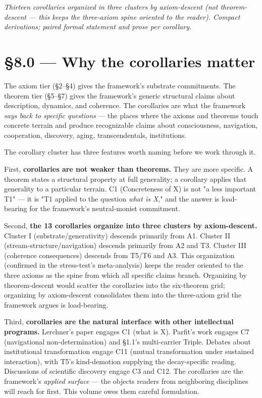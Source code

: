 \documentclass[11pt, openany]{book}
\newcommand{\sectionbreak}{\clearpage}
\begin{document}
\textit{Thirteen corollaries organized in three clusters by axiom-descent (not theorem-descent --- this keeps the three-axiom spine oriented to the reader). Compact derivations; paired formal statement and prose per corollary.}

\sectionbreak

\section{§8.0 --- Why the corollaries matter}

The axiom tier (§2–§4) gives the framework's substrate commitments. The theorem tier (§5–§7) gives the framework's generic structural claims about description, dynamics, and coherence. The corollaries are what the framework \textit{says back to specific questions} --- the places where the axioms and theorems touch concrete terrain and produce recognizable claims about consciousness, navigation, cooperation, discovery, aging, transcendentals, institutions.

The corollary cluster has three features worth naming before we work through it.

First, \textbf{corollaries are not weaker than theorems.} They are more specific. A theorem states a structural property at full generality; a corollary applies that generality to a particular terrain. C1 (Concreteness of X) is not "a less important T1" --- it is "T1 applied to the question \textit{what is X}," and the answer is load-bearing for the framework's neutral-monist commitment.

Second, \textbf{the 13 corollaries organize into three clusters by axiom-descent.} Cluster I (substrate/generativity) descends primarily from A1. Cluster II (stream-structure/navigation) descends primarily from A2 and T3. Cluster III (coherence consequences) descends from T5/T6 and A3. This organization (confirmed in the stress-test's meta-analysis) keeps the reader oriented to the three axioms as the spine from which all specific claims branch. Organizing by theorem-descent would scatter the corollaries into the six-theorem grid; organizing by axiom-descent consolidates them into the three-axiom grid the framework argues is load-bearing.

Third, \textbf{corollaries are the natural interface with other intellectual programs.} Lerchner's paper engages C1 (what is X). Parfit's work engages C7 (navigational non-determination) and §1.1's multi-carrier Triple. Debates about institutional transformation engage C11 (mutual transformation under sustained interaction), with T5's kind-demotion supplying the decay-specific reading. Discussions of scientific discovery engage C3 and C12. The corollaries are the framework's \textit{applied surface} --- the objects readers from neighboring disciplines will reach for first. This volume owes them careful formulation.
\end{document}
